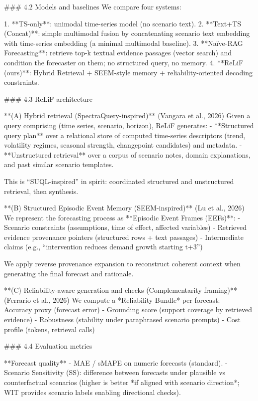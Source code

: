 ### 4.2 Models and baselines  
We compare four systems:

1. **TS-only**: unimodal time-series model (no scenario text).  
2. **Text+TS (Concat)**: simple multimodal fusion by concatenating scenario text embedding with time-series embedding (a minimal multimodal baseline).  
3. **Naïve-RAG Forecasting**: retrieve top-k textual evidence passages (vector search) and condition the forecaster on them; no structured query, no memory.  
4. **ReLiF (ours)**: Hybrid Retrieval + SEEM-style memory + reliability-oriented decoding constraints.

### 4.3 ReLiF architecture  

**(A) Hybrid retrieval (SpectraQuery-inspired)** (Vangara et al., 2026)  
Given a query comprising (time series, scenario, horizon), ReLiF generates:
- **Structured query plan** over a relational store of computed time-series descriptors (trend, volatility regimes, seasonal strength, changepoint candidates) and metadata.
- **Unstructured retrieval** over a corpus of scenario notes, domain explanations, and past similar scenario templates.

This is “SUQL-inspired” in spirit: coordinated structured and unstructured retrieval, then synthesis.

**(B) Structured Episodic Event Memory (SEEM-inspired)** (Lu et al., 2026)  
We represent the forecasting process as **Episodic Event Frames (EEFs)**:
- Scenario constraints (assumptions, time of effect, affected variables)  
- Retrieved evidence provenance pointers (structured rows + text passages)  
- Intermediate claims (e.g., “intervention reduces demand growth starting t+3”)  

We apply reverse provenance expansion to reconstruct coherent context when generating the final forecast and rationale.

**(C) Reliability-aware generation and checks (Complementarity framing)** (Ferrario et al., 2026)  
We compute a *Reliability Bundle* per forecast:
- Accuracy proxy (forecast error)  
- Grounding score (support coverage by retrieved evidence)  
- Robustness (stability under paraphrased scenario prompts)  
- Cost profile (tokens, retrieval calls)

### 4.4 Evaluation metrics  

**Forecast quality**
- MAE / sMAPE on numeric forecasts (standard).  
- Scenario Sensitivity (SS): difference between forecasts under plausible vs counterfactual scenarios (higher is better *if aligned with scenario direction*; WIT provides scenario labels enabling directional checks).

